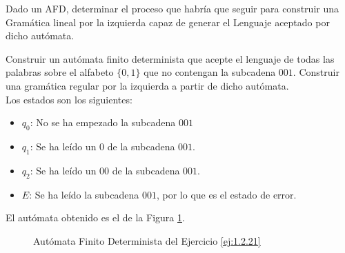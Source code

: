 \begin{ejercicio}
    Dado un AFD, determinar el proceso que habría que seguir para construir una Gramática lineal por la izquierda capaz de generar el Lenguaje aceptado por dicho autómata.
\end{ejercicio}

\begin{ejercicio} \label{ej:1.2.21}
    Construir un autómata finito determinista que acepte el lenguaje de todas las palabras sobre el alfabeto $\{0, 1\}$ que no contengan la subcadena $001$.
    Construir una gramática regular por la izquierda a partir de dicho autómata.\\

    Los estados son los siguientes:
    \begin{itemize}
        \item \ul{$q_0$}: No se ha empezado la subcadena $001$
        \item \ul{$q_1$}: Se ha leído un $0$ de la subcadena $001$.
        \item \ul{$q_2$}: Se ha leído un $00$ de la subcadena $001$.
        \item \ul{$E$}: Se ha leído la subcadena $001$, por lo que es el estado de error.
    \end{itemize}

    El autómata obtenido es el de la Figura \ref{fig:ej:1.2.21}.
    \begin{figure}
        \centering
        \caption{Autómata Finito Determinista del Ejercicio \ref{ej:1.2.21}}
        \label{fig:ej:1.2.21}
    \end{figure}
\end{ejercicio}

